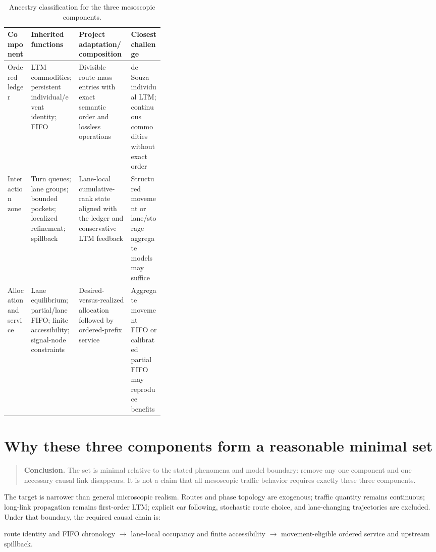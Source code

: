 \documentclass[11pt,a4paper]{article}
\newcommand{\keypoint}[1]{\begin{quote}\colorbox{bluegray}{\parbox{0.93\linewidth}{\textbf{Conclusion.} #1}}\end{quote}}
\begin{document}
\begin{table}[ht]
\centering
\caption{Ancestry classification for the three mesoscopic components.}
\label{tab:ancestry}
\begin{tabularx}{\textwidth}{p{0.15\linewidth}YYp{0.21\linewidth}}
\toprule
\textbf{Component} & \textbf{Inherited functions} & \textbf{Project adaptation/composition} & \textbf{Closest challenge}\\
\midrule
Ordered ledger & LTM commodities; persistent individual/event identity; FIFO & Divisible route-mass entries with exact semantic order and lossless operations & de Souza individual LTM; continuous commodities without exact order\\
Interaction zone & Turn queues; lane groups; bounded pockets; localized refinement; spillback & Lane-local cumulative-rank state aligned with the ledger and conservative LTM feedback & Structured movement or lane/storage aggregate models may suffice\\
Allocation and service & Lane equilibrium; partial/lane FIFO; finite accessibility; signal-node constraints & Desired-versus-realized allocation followed by ordered-prefix service & Aggregate movement FIFO or calibrated partial FIFO may reproduce benefits\\
\bottomrule
\end{tabularx}
\end{table}

\section{Why these three components form a reasonable minimal set}

\keypoint{The set is minimal relative to the stated phenomena and model boundary: remove any one component and one necessary causal link disappears. It is not a claim that all mesoscopic traffic behavior requires exactly these three components.}

The target is narrower than general microscopic realism. Routes and phase topology are exogenous; traffic quantity remains continuous; long-link propagation remains first-order LTM; explicit car following, stochastic route choice, and lane-changing trajectories are excluded. Under that boundary, the required causal chain is:

\begin{center}
route identity and FIFO chronology $\rightarrow$ lane-local occupancy and finite accessibility $\rightarrow$ movement-eligible ordered service and upstream spillback.
\end{center}
\end{document}
